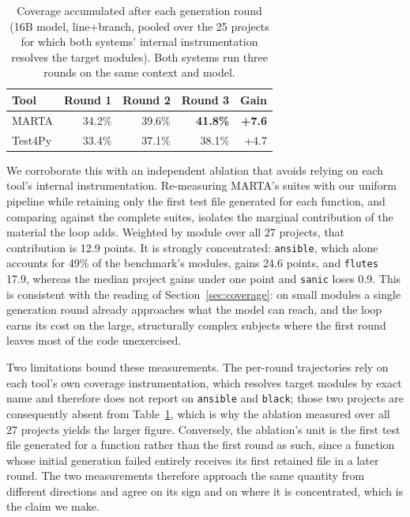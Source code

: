 \begin{table}[htpb]
\centering
\caption{Coverage accumulated after each generation round (16B model, line+branch,
pooled over the 25 projects for which both systems' internal instrumentation resolves
the target modules). Both systems run three rounds on the same context and model.}
\label{tab:rounds}
\begin{tabular}{lrrrr}
\hline
\textbf{Tool} & \textbf{Round 1} & \textbf{Round 2} & \textbf{Round 3} & \textbf{Gain} \\
\hline
MARTA    & 34.2\% & 39.6\% & \textbf{41.8\%} & \textbf{+7.6} \\
Test4Py  & 33.4\% & 37.1\% & 38.1\%          & +4.7 \\
\hline
\end{tabular}
\end{table}

We corroborate this with an independent ablation that avoids relying on each tool's
internal instrumentation. Re-measuring MARTA's suites with our uniform pipeline while
retaining only the first test file generated for each function, and comparing against
the complete suites, isolates the marginal contribution of the material the loop adds.
Weighted by module over all 27 projects, that contribution is 12.9 points. It is
strongly concentrated: \texttt{ansible}, which alone accounts for 49\% of the
benchmark's modules, gains 24.6 points, and \texttt{flutes} 17.9, whereas the median
project gains under one point and \texttt{sanic} loses 0.9. This is consistent with
the reading of Section~\ref{sec:coverage}: on small modules a single generation round
already approaches what the model can reach, and the loop earns its cost on the large,
structurally complex subjects where the first round leaves most of the code
unexercised.

Two limitations bound these measurements. The per-round trajectories rely on each
tool's own coverage instrumentation, which resolves target modules by exact name and
therefore does not report on \texttt{ansible} and \texttt{black}; those two projects
are consequently absent from Table~\ref{tab:rounds}, which is why the ablation
measured over all 27 projects yields the larger figure. Conversely, the ablation's
unit is the first test file generated for a function rather than the first round as
such, since a function whose initial generation failed entirely receives its first
retained file in a later round. The two measurements therefore approach the same
quantity from different directions and agree on its sign and on where it is
concentrated, which is the claim we make.

